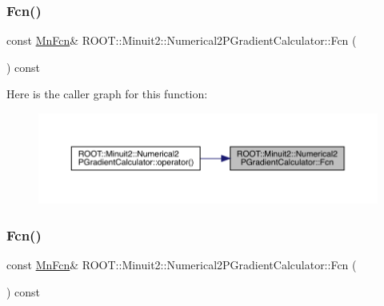 \subsubsection{\texorpdfstring{Fcn()}{Fcn()}\hspace{0.1cm}{\footnotesize\ttfamily [1/2]}}
{\footnotesize\ttfamily const \mbox{\hyperlink{classROOT_1_1Minuit2_1_1MnFcn}{Mn\+Fcn}}\& R\+O\+O\+T\+::\+Minuit2\+::\+Numerical2\+P\+Gradient\+Calculator\+::\+Fcn (\begin{DoxyParamCaption}{ }\end{DoxyParamCaption}) const\hspace{0.3cm}{\ttfamily [inline]}}

Here is the caller graph for this function\+:\nopagebreak
\begin{figure}[H]
\begin{center}
\leavevmode
\includegraphics[width=350pt]{d0/d82/classROOT_1_1Minuit2_1_1Numerical2PGradientCalculator_a84287ad0b3e0b38769c3ecb00cac1c22_icgraph}
\end{center}
\end{figure}
\mbox{\label{classROOT_1_1Minuit2_1_1Numerical2PGradientCalculator_a84287ad0b3e0b38769c3ecb00cac1c22}} 
\subsubsection{\texorpdfstring{Fcn()}{Fcn()}\hspace{0.1cm}{\footnotesize\ttfamily [2/2]}}
{\footnotesize\ttfamily const \mbox{\hyperlink{classROOT_1_1Minuit2_1_1MnFcn}{Mn\+Fcn}}\& R\+O\+O\+T\+::\+Minuit2\+::\+Numerical2\+P\+Gradient\+Calculator\+::\+Fcn (\begin{DoxyParamCaption}{ }\end{DoxyParamCaption}) const\hspace{0.3cm}{\ttfamily [inline]}}

